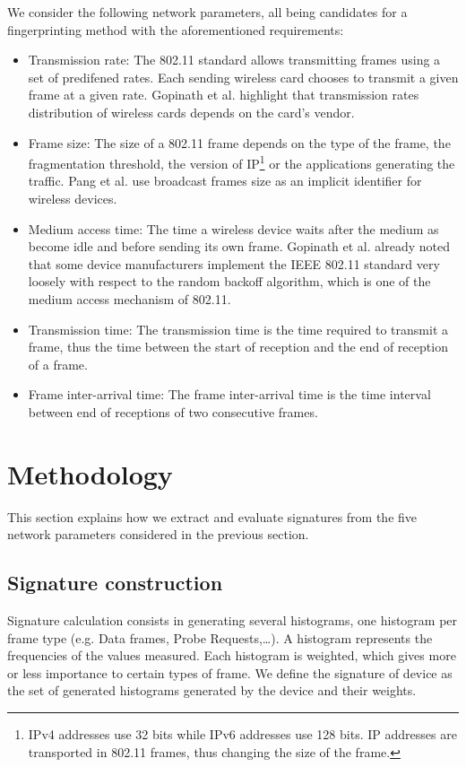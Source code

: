 \documentclass[10pt, conference, compsocconf, letterpaper]{IEEEtran}
\begin{document}
We consider the following network parameters, all being candidates for a fingerprinting method with the aforementioned requirements:
\begin{itemize}
\item{Transmission rate:} The 802.11 standard \cite{IEEE:80211} allows transmitting frames using a set of predifened rates. Each sending wireless card chooses to transmit a given frame at a given rate.
Gopinath et al. \cite{Gopinath:WiNTECH} highlight that transmission rates distribution of wireless cards depends on the card's vendor. 
\item{Frame size:} The size of a 802.11 frame depends on the type of the frame, the fragmentation threshold, the version of IP\footnote{IPv4 addresses use 32 bits while IPv6 addresses use 128 bits. IP addresses are transported in 802.11 frames, thus changing the size of the frame.} or the applications generating the traffic. Pang et al. \cite{Pang:Mobicom} use broadcast frames size as an implicit identifier for wireless devices.
\item{Medium access time:} 
The time a wireless device waits after the medium as become idle and before sending its own frame.
Gopinath et al. \cite{Gopinath:WiNTECH} already noted that some device manufacturers implement the IEEE 802.11 standard very loosely with respect to the random backoff algorithm, which is one of the medium access mechanism of 802.11.
\item{Transmission time:} The transmission time is the time required to transmit a frame, thus the time between the start of reception and the end of reception of a frame.
\item{Frame inter-arrival time:} The frame inter-arrival time is the time interval between end of receptions of two consecutive frames. 
\end{itemize}



\section{Methodology}
\label{sec:methodology}
This section explains how we extract and evaluate signatures from the five network parameters considered in the previous section.

\subsection{Signature construction}

Signature calculation consists in generating several histograms, one histogram per frame type (e.g. Data frames, Probe Requests,\ldots). A histogram represents the frequencies of the values measured. Each histogram is weighted, which gives more or less importance to certain types of frame. 
We define the signature of device as the set of generated histograms generated by the device and their weights. 
\end{document}
